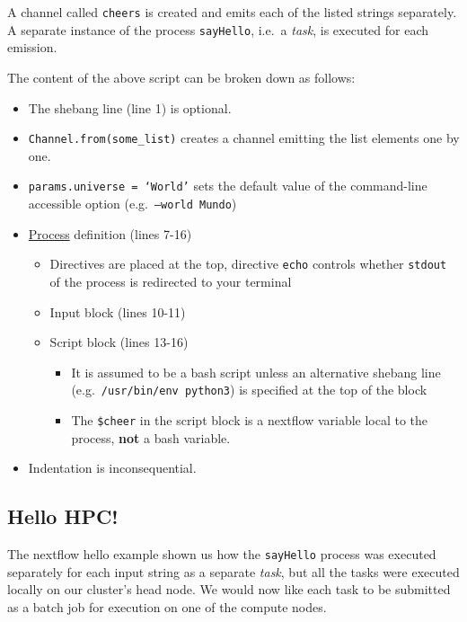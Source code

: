 A channel called \texttt{cheers} is created and emits each of the listed strings separately. 
A separate instance of the process \texttt{sayHello}, i.e.\ a \emph{task}, is executed for each emission. 

\begin{note}
The content of the above script can be broken down as follows:
\begin{itemize}
  \item The shebang line (line 1) is optional.
  \item \texttt{Channel.from(some\_list)} creates a channel emitting the list elements one by one.
  \item \texttt{params.universe = `World'} sets the default value of the command-line accessible option (e.g.\ \texttt{--world Mundo})
  \item \href{https://www.nextflow.io/docs/latest/process.html}{Process} definition (lines 7-16)
  \begin{itemize}
    \item Directives are placed at the top, directive \texttt{echo} controls whether \texttt{stdout} of the process is redirected to your terminal
    \item Input block (lines 10-11) 
    \item Script block (lines 13-16)
    \begin{itemize}
     \item It is assumed to be a bash script unless an alternative shebang line (e.g.\  \texttt{/usr/bin/env python3}) is specified at the top of the block 
     \item The \texttt{\$cheer} in the script block is a nextflow variable local to the process, \textbf{not} a bash variable.
    \end{itemize}
  \end{itemize}
  
  \item Indentation is inconsequential. 
\end{itemize}

\end{note}


\subsection{Hello HPC!}

The nextflow hello example shown us how the \texttt{sayHello} process was executed separately for each input string as a separate \emph{task}, but all the tasks were executed locally on our cluster's head node. 
We would now like each task to be submitted as a batch job for execution on one of the compute nodes.

